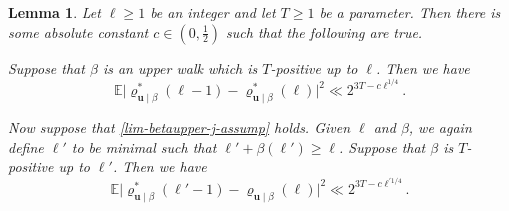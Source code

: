 \documentclass[11pt,reqno]{amsart}
\numberwithin{equation}{section}
\newtheorem{lemma}[theorem]{Lemma}
\theoremstyle{definition}
\theoremstyle{remark}
\newcommand{\mb}{\mathbb}
\newcommand{\mbf}{\mathbf}
\renewcommand{\ge}{\geqslant}
\begin{document}
\begin{lemma}\label{lemma7point3}
Let $\ell\ge 1$ be an integer and let $T \ge 1$ be a parameter. Then there is some absolute constant $c \in (0,\frac{1}{2})$ such that the following are true.

Suppose that $\beta$ is an upper walk which is $T$-positive up to $\ell$. Then we have \begin{equation}\label{lem73-first} \mb{E} \big| \varrho^*_{\mbf{u} \mid \beta}(\ell-1) - \varrho^*_{\mbf{u} \mid \beta}(\ell) \big|^2\ll 2^{3T - c\ell^{1/4}}.\end{equation}

Now suppose that \cref{lim-betaupper-j-assump} holds. Given $\ell$ and $\beta$, we again define $\ell'$ to be minimal such that $\ell' + \beta(\ell') \ge \ell$. Suppose that $\beta$ is $T$-positive up to $\ell'$. Then we have \begin{equation}\label{lem73-second} \mb{E} \big| \varrho^*_{\mbf{u} \mid \beta}(\ell'-1) - \varrho_{\mbf{u} \mid \beta}(\ell) \big|^2\ll 2^{3T - c\ell^{\prime 1/4}}.\end{equation}
\end{lemma}
\end{document}
